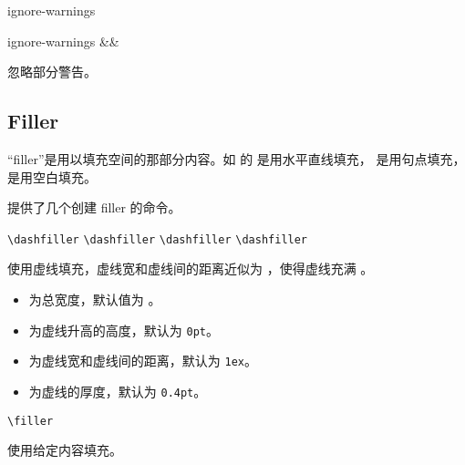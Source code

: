 \documentclass{whudoc}
\begin{document}
\begin{keyval}[path=frame]{ignore-warnings}
  \begin{syntax}
    ignore-warnings &&
  \end{syntax}
忽略部分警告。
\end{keyval}


\subsection{Filler}

“filler”是用以填充空间的那部分内容。如 \LaTeXe 的  是用水平直线填充，
 是用句点填充， 是用空白填充。

 提供了几个创建 filler 的命令。

\begin{function}{\dashfiller}
  \begin{syntax}
    \verb|\dashfiller|
    \verb|\dashfiller| 
    \verb|\dashfiller| 
    \verb|\dashfiller|  
  \end{syntax}
使用虚线填充，虚线宽和虚线间的距离近似为 ，使得虚线充满 。

\begin{itemize}[nosep]
  \item {} 为总宽度，默认值为 。
  \item {} 为虚线升高的高度，默认为 \texttt{0pt}。
  \item {} 为虚线宽和虚线间的距离，默认为 \texttt{1ex}。
  \item {} 为虚线的厚度，默认为 \texttt{0.4pt}。
\end{itemize}
\end{function}

\begin{xample}
\noindent\llap{|}\dashfiller \par %
\noindent\llap{|}\dashfiller [.5ex] \par %
\noindent\llap{|}\dashfiller [.5ex][3pt] \par 
\stopxamplecode
\xampleprint 
\end{xample}

\begin{function}{\filler}
  \begin{syntax}
    \verb|\filler| 
  \end{syntax}
使用给定内容填充。
\end{function}
\end{document}
